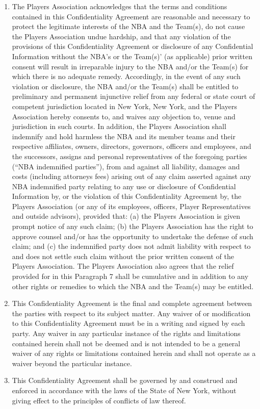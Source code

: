 \documentclass[
]{book}
\begin{document}
\begin{enumerate}
\item
  The Players Association acknowledges that the terms and conditions contained in this Confidentiality Agreement are reasonable and necessary to protect the legitimate interests of the NBA and the Team(s), do not cause the Players Association undue hardship, and that any violation of the provisions of this Confidentiality Agreement or disclosure of any Confidential Information without the NBA's or the Team(s)' (as applicable) prior written consent will result in irreparable injury to the NBA and/or the Team(s) for which there is no adequate remedy. Accordingly, in the event of any such violation or disclosure, the NBA and/or the Team(s) shall be entitled to preliminary and permanent injunctive relief from any federal or state court of competent jurisdiction located in New York, New York, and the Players Association hereby consents to, and waives any objection to, venue and jurisdiction in such courts. In addition, the Players Association shall indemnify and hold harmless the NBA and its member teams and their respective affiliates, owners, directors, governors, officers and employees, and the successors, assigns and personal representatives of the foregoing parties (``NBA indemnified parties''), from and against all liability, damages and costs (including attorneys fees) arising out of any claim asserted against any NBA indemnified party relating to any use or disclosure of Confidential Information by, or the violation of this Confidentiality Agreement by, the Players Association (or any of its employees, officers, Player Representatives and outside advisors), provided that: (a) the Players Association is given prompt notice of any such claim; (b) the Players Association has the right to approve counsel and/or has the opportunity to undertake the defense of such claim; and (c) the indemnified party does not admit liability with respect to and does not settle such claim without the prior written consent of the Players Association. The Players Association also agrees that the relief provided for in this Paragraph 7 shall be cumulative and in addition to any other rights or remedies to which the NBA and the Team(s) may be entitled.
\item
  This Confidentiality Agreement is the final and complete agreement between the parties with respect to its subject matter. Any waiver of or modification to this Confidentiality Agreement must be in a writing and signed by each party. Any waiver in any particular instance of the rights and limitations contained herein shall not be deemed and is not intended to be a general waiver of any rights or limitations contained herein and shall not operate as a waiver beyond the particular instance.
\item
  This Confidentiality Agreement shall be governed by and construed and enforced in accordance with the laws of the State of New York, without giving effect to the principles of conflicts of law thereof.
\end{enumerate}
\end{document}
